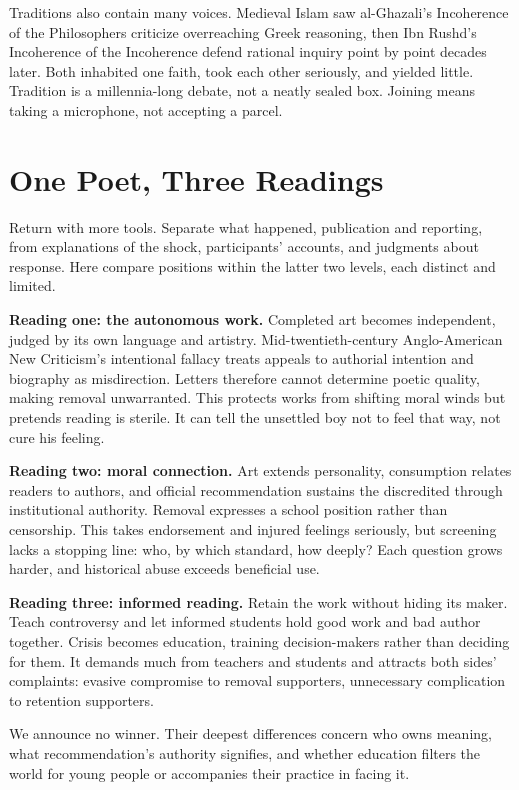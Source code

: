 Traditions also contain many voices. Medieval Islam saw al-Ghazali's Incoherence of the Philosophers criticize overreaching Greek reasoning, then Ibn Rushd's Incoherence of the Incoherence defend rational inquiry point by point decades later. Both inhabited one faith, took each other seriously, and yielded little. Tradition is a millennia-long debate, not a neatly sealed box. Joining means taking a microphone, not accepting a parcel.

\section{One Poet, Three Readings}
Return with more tools. Separate what happened, publication and reporting, from explanations of the shock, participants' accounts, and judgments about response. Here compare positions within the latter two levels, each distinct and limited.

\textbf{Reading one: the autonomous work.} Completed art becomes independent, judged by its own language and artistry. Mid-twentieth-century Anglo-American New Criticism's intentional fallacy treats appeals to authorial intention and biography as misdirection. Letters therefore cannot determine poetic quality, making removal unwarranted. This protects works from shifting moral winds but pretends reading is sterile. It can tell the unsettled boy not to feel that way, not cure his feeling.

\textbf{Reading two: moral connection.} Art extends personality, consumption relates readers to authors, and official recommendation sustains the discredited through institutional authority. Removal expresses a school position rather than censorship. This takes endorsement and injured feelings seriously, but screening lacks a stopping line: who, by which standard, how deeply? Each question grows harder, and historical abuse exceeds beneficial use.

\textbf{Reading three: informed reading.} Retain the work without hiding its maker. Teach controversy and let informed students hold good work and bad author together. Crisis becomes education, training decision-makers rather than deciding for them. It demands much from teachers and students and attracts both sides' complaints: evasive compromise to removal supporters, unnecessary complication to retention supporters.

We announce no winner. Their deepest differences concern who owns meaning, what recommendation's authority signifies, and whether education filters the world for young people or accompanies their practice in facing it.

